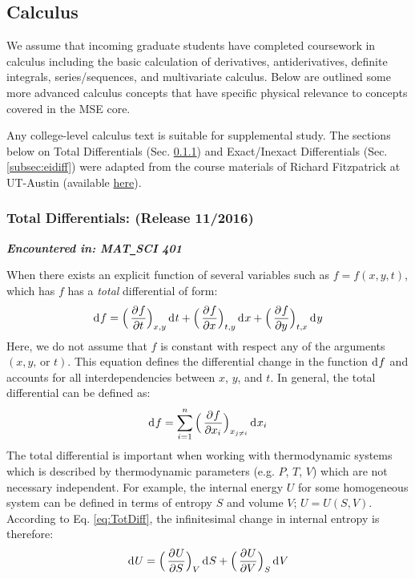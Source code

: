 \subsection{Calculus}

We assume that incoming graduate students have completed coursework in calculus including the basic calculation of derivatives, antiderivatives, definite integrals, series/sequences, and multivariate calculus. Below are outlined some more advanced calculus concepts that have specific physical relevance to concepts covered in the MSE core.

Any college-level calculus text is suitable for supplemental study. The sections below on Total Differentials (Sec. \ref{subsec:totdiff}) and Exact/Inexact Differentials (Sec. \ref{subsec:eidiff}) were adapted from the course materials of Richard Fitzpatrick at UT-Austin (available \href{http://farside.ph.utexas.edu/teaching/sm1/Thermal.pdf}{here}).
	
\subsubsection{Total Differentials: \hfill(Release 11/2016)} \label{subsec:totdiff}

\textit{\textbf{Encountered in: MAT\texttt{\_}SCI 401}} 
	
When there exists an explicit function of several variables such as $f = f(x,y,t)$, which has $f$ has a \emph{total} differential of form:
%
\begin{align}
	\mathop{}\!\mathrm{d^{}}{f} = \Big(\mathop{}\!\frac{\partial^{}{f}}{\partial{t}^{}}\Big)_{x,y}\mathop{}\!\mathrm{d^{}}{t} + \Big(\mathop{}\!\frac{\partial^{}{f}}{\partial{x}^{}}\Big)_{t,y} \mathop{}\!\mathrm{d^{}}{x} + \Big(\mathop{}\!\frac{\partial^{}{f}}{\partial{y}^{}}\Big)_{t,x} \mathop{}\!\mathrm{d^{}}{y}
\end{align}
%
Here, we do not assume that $f$ is constant with respect any of the arguments $(x\text{,}\, y\text{, or } t)$. This equation defines the differential change in the function $\mathop{}\!\mathrm{d^{}}{f}$ and accounts for all interdependencies between $x$, $y$, and $t$. In general, the total differential can be defined as:
%
\begin{align} \label{eq:TotDiff}
	\mathop{}\!\mathrm{d^{}}{f} = \sum\limits_{i=1}^n \Big(\mathop{}\!\frac{\partial^{}{f}}{\partial{x_i}^{}}\Big)_{x_{j\neq i}}\mathop{}\!\mathrm{d^{}}{x_i}
\end{align}
%
The total differential is important when working with thermodynamic systems which is described by thermodynamic parameters (e.g. $P$, $T$, $V$) which are not necessary independent. For example, the internal energy $U$ for some homogeneous system can be defined in terms of entropy $S$ and volume $V$; $U = U(S,V)$. According to Eq. \ref{eq:TotDiff}, the infinitesimal change in internal entropy is therefore:
%
 \begin{align}
	\mathop{}\!\mathrm{d^{}}{U} = \Big(\mathop{}\!\frac{\partial^{}{U}}{\partial{S}^{}}\Big)_{V}\mathop{}\!\mathrm{d^{}}{S} + \Big(\mathop{}\!\frac{\partial^{}{U}}{\partial{V}^{}}\Big)_{S} \mathop{}\!\mathrm{d^{}}{V}
\end{align}
%
